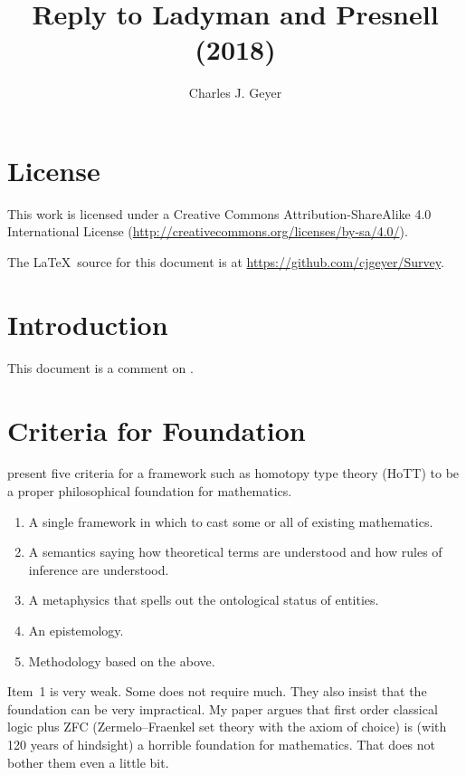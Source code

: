 \documentclass[11pt]{article}
\begin{document}
\title{Reply to Ladyman and Presnell (2018)}
\author{Charles J. Geyer}
\maketitle

\section{License}

This work is licensed under a Creative Commons
Attribution-ShareAlike 4.0 International License
(\url{http://creativecommons.org/licenses/by-sa/4.0/}).

The \LaTeX\ source for this document is
at \url{https://github.com/cjgeyer/Survey}.

\section{Introduction}

This document is a comment on \citet{ladyman-presnell-foundations}.

\section{Criteria for Foundation}

\citet{ladyman-presnell-foundations} present five criteria for a framework
such as homotopy type theory (HoTT) to be a proper philosophical foundation
for mathematics.
\begin{enumerate}
\item A single framework in which to cast some or all of existing mathematics.
\item A semantics saying how theoretical terms are understood and how rules
    of inference are understood.
\item A metaphysics that spells out the ontological status of entities.
\item An epistemology.
\item Methodology based on the above.
\end{enumerate}

Item~1 is very weak.  Some does not require much.  They also insist that
the foundation can be very impractical.  My paper argues that first order
classical logic plus ZFC (Zermelo–Fraenkel set theory with the axiom of
choice) is (with 120 years of hindsight) a horrible foundation for
mathematics.  That does not bother them even a little bit.
\end{document}
